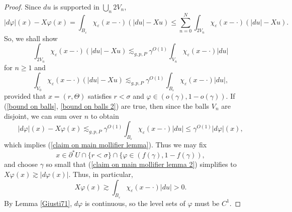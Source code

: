 \begin{proof}
Since $du$ is supported in $\bigcup_n 2V_n$,
$$|d\varphi|(x) - X\varphi(x) = \int_{B_\varepsilon} \chi_\varepsilon(x - \cdot)(|du| - Xu) \leq \sum_{n=0}^N \int_{2V_n} \chi_\varepsilon(x - \cdot)(|du| - Xu).$$
So, we shall show
\begin{equation}\label{bound on balls}
\int_{2V_n} \chi_\varepsilon(x - \cdot)(|du| - Xu) \lesssim_{g, p, P} \gamma^{O(1)} \int_{V_n} \chi_\varepsilon(x - \cdot)|du|
\end{equation}
for $n \geq 1$ and
\begin{equation}\label{bound on balls 2}
\int_{V_0} \chi_\varepsilon(x - \cdot)(|du| - Xu) \lesssim_{g, p, P} \gamma^{O(1)} \int_{B_\varepsilon} \chi_\varepsilon(x - \cdot)|du|,
\end{equation}
provided that $x = (r, \Theta)$ satisfies $r < \sigma$ and $\varphi \in (o(\gamma), 1 - o(\gamma))$.
If (\ref{bound on balls}, \ref{bound on balls 2}) are true, then since the balls $V_n$ are disjoint, we can sum over $n$ to obtain
\begin{equation}\label{claim on main mollifier lemma 2}|d\varphi|(x) - X\varphi(x) \lesssim_{g, p, P} \gamma^{O(1)} \int_{B_\varepsilon} \chi_\varepsilon(x - \cdot)|du| \leq \gamma^{O(1)} |d\varphi|(x),
\end{equation}
which implies (\ref{claim on main mollifier lemma}). Thus we may fix
$$x \in \partial^* U \cap \{r < \sigma\} \cap \{\varphi \in (f(\gamma), 1 - f(\gamma)),$$
and choose $\gamma$ so small that (\ref{claim on main mollifier lemma 2}) simplifies to $X\varphi(x) \gtrsim |d\varphi(x)|$.
Thus, in particular,
$$X\varphi(x) \gtrsim \int_{B_\varepsilon} \chi_\varepsilon(x - \cdot) |du| > 0.$$
By Lemma \ref{Giusti71}, $d\varphi$ is continuous, so the level sets of $\varphi$ must be $C^1$.
\end{proof}

